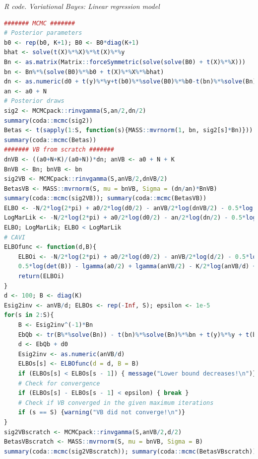 \begin{tcolorbox}[enhanced,width=4.67in,center upper,
	fontupper=\large\bfseries,drop shadow southwest,sharp corners]
	\textit{R code. Variational Bayes: Linear regression model}
	\begin{VF}
		\begin{lstlisting}[language=R]
####### MCMC #######
# Posterior parameters
b0 <- rep(b0, K+1); B0 <- B0*diag(K+1)
bhat <- solve(t(X)%*%X)%*%t(X)%*%y
Bn <- as.matrix(Matrix::forceSymmetric(solve(solve(B0) + t(X)%*%X)))
bn <- Bn%*%(solve(B0)%*%b0 + t(X)%*%X%*%bhat)
dn <- as.numeric(d0 + t(y)%*%y+t(b0)%*%solve(B0)%*%b0-t(bn)%*%solve(Bn)%*%bn)
an <- a0 + N
# Posterior draws
sig2 <- MCMCpack::rinvgamma(S,an/2,dn/2)
summary(coda::mcmc(sig2))
Betas <- t(sapply(1:S, function(s){MASS::mvrnorm(1, bn, sig2[s]*Bn)}))
summary(coda::mcmc(Betas))
####### VB from scratch #######
dnVB <- ((a0+N+K)/(a0+N))*dn; anVB <- a0 + N + K
BnVB <- Bn; bnVB <- bn
sig2VB <- MCMCpack::rinvgamma(S,anVB/2,dnVB/2) 
BetasVB <- MASS::mvrnorm(S, mu = bnVB, Sigma = (dn/an)*BnVB)
summary(coda::mcmc(sig2VB)); summary(coda::mcmc(BetasVB))
ELBO <- -N/2*log(2*pi) + a0/2*log(d0/2) - anVB/2*log(dnVB/2) - 0.5*log(det(B0)) + 0.5*log(det(BnVB)) - lgamma(a0/2) + lgamma(anVB/2) - K/2*log(anVB/dnVB) + K/2
LogMarLik <- -N/2*log(2*pi) + a0/2*log(d0/2) - an/2*log(dn/2) - 0.5*log(det(B0)) + 0.5*log(det(Bn)) - lgamma(a0/2) + lgamma(an/2)
ELBO; LogMarLik; ELBO < LogMarLik 
# CAVI
ELBOfunc <- function(d,B){
	ELBOi <- -N/2*log(2*pi) + a0/2*log(d0/2) - anVB/2*log(d/2) - 0.5*log(det(B0)) + 
	0.5*log(det(B)) - lgamma(a0/2) + lgamma(anVB/2) - K/2*log(anVB/d) + 0.5*(anVB/d)*tr(B%*%solve(Bn))
	return(ELBOi)
}
d <- 100; B <- diag(K) 
Esig2inv <- anVB/d; ELBOs <- rep(-Inf, S); epsilon <- 1e-5
for(s in 2:S){
	B <- Esig2inv^(-1)*Bn
	EbQb <- tr(B%*%solve(Bn)) - t(bn)%*%solve(Bn)%*%bn + t(y)%*%y + t(b0)%*%solve(B0)%*%b0
	d <- EbQb + d0
	Esig2inv <- as.numeric(anVB/d)
	ELBOs[s] <- ELBOfunc(d = d, B = B)
	if (ELBOs[s] < ELBOs[s - 1]) { message("Lower bound decreases!\n")}
	# Check for convergence
	if (ELBOs[s] - ELBOs[s - 1] < epsilon) { break }
	# Check if VB converged in the given maximum iterations
	if (s == S) {warning("VB did not converge!\n")}
}
sig2VBscratch <- MCMCpack::rinvgamma(S,anVB/2,d/2) 
BetasVBscratch <- MASS::mvrnorm(S, mu = bnVB, Sigma = B)
summary(coda::mcmc(sig2VBscratch)); summary(coda::mcmc(BetasVBscratch))
\end{lstlisting}
	\end{VF}
\end{tcolorbox}

